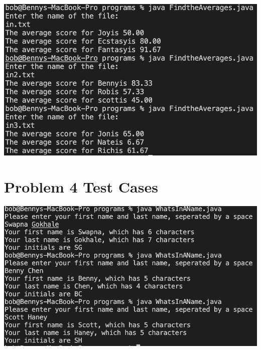 \documentclass{article}
\begin{document}
\begin{center}
    \includegraphics[width=\textwidth]{./images/findaverages.png}
\end{center}

\section{Problem 4 Test Cases}

\begin{center}
    \includegraphics[width=\textwidth]{./images/name.png}
\end{center}
\end{document}
